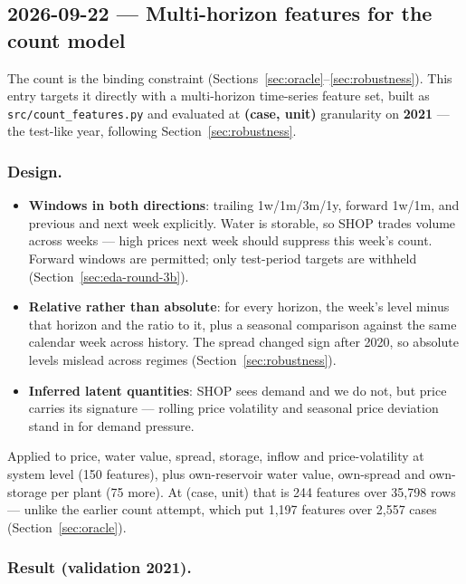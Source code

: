 \subsection{2026-09-22 --- Multi-horizon features for the count model}
\label{sec:countfeat}

The count is the binding constraint (Sections~\ref{sec:oracle}--\ref{sec:robustness}). This entry
targets it directly with a multi-horizon time-series feature set, built as
\texttt{src/count\_features.py} and evaluated at \textbf{(case, unit)} granularity on
\textbf{2021} --- the test-like year, following Section~\ref{sec:robustness}.

\subsubsection*{Design.}
\begin{itemize}\itemsep1pt
  \item \textbf{Windows in both directions}: trailing 1w/1m/3m/1y, forward 1w/1m, and previous and
        next week explicitly. Water is storable, so SHOP trades volume across weeks --- high prices
        next week should suppress this week's count. Forward windows are permitted; only
        test-period targets are withheld (Section~\ref{sec:eda-round-3b}).
  \item \textbf{Relative rather than absolute}: for every horizon, the week's level minus that
        horizon and the ratio to it, plus a seasonal comparison against the same calendar week
        across history. The spread changed sign after 2020, so absolute levels mislead across
        regimes (Section~\ref{sec:robustness}).
  \item \textbf{Inferred latent quantities}: SHOP sees demand and we do not, but price carries its
        signature --- rolling price volatility and seasonal price deviation stand in for demand
        pressure.
\end{itemize}

Applied to price, water value, spread, storage, inflow and price-volatility at system level (150
features), plus own-reservoir water value, own-spread and own-storage per plant (75 more). At
(case, unit) that is 244 features over 35{,}798 rows --- unlike the earlier count attempt, which
put 1{,}197 features over 2{,}557 cases (Section~\ref{sec:oracle}).

\subsubsection*{Result (validation 2021).}

